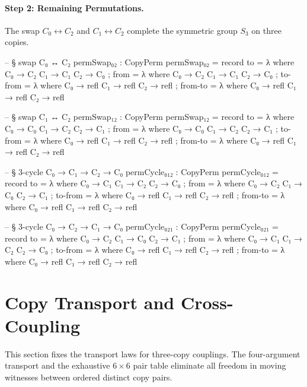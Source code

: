 \documentclass[11pt,a4paper]{book}
\begin{document}
\paragraph{Step 2: Remaining Permutations.}
The swap $C_0 \leftrightarrow C_2$ and $C_1 \leftrightarrow C_2$
complete the symmetric group $S_3$ on three copies.

\begin{code}
-- § swap C₀ ↔ C₂
permSwap₀₂ : CopyPerm
permSwap₀₂ = record
  { to = λ where
      C₀ → C₂
      C₁ → C₁
      C₂ → C₀
  ; from = λ where
      C₀ → C₂
      C₁ → C₁
      C₂ → C₀
  ; to-from = λ where
      C₀ → refl
      C₁ → refl
      C₂ → refl
  ; from-to = λ where
      C₀ → refl
      C₁ → refl
      C₂ → refl
  }

-- § swap C₁ ↔ C₂
permSwap₁₂ : CopyPerm
permSwap₁₂ = record
  { to = λ where
      C₀ → C₀
      C₁ → C₂
      C₂ → C₁
  ; from = λ where
      C₀ → C₀
      C₁ → C₂
      C₂ → C₁
  ; to-from = λ where
      C₀ → refl
      C₁ → refl
      C₂ → refl
  ; from-to = λ where
      C₀ → refl
      C₁ → refl
      C₂ → refl
  }

-- § 3-cycle C₀ → C₁ → C₂ → C₀
permCycle₀₁₂ : CopyPerm
permCycle₀₁₂ = record
  { to = λ where
      C₀ → C₁
      C₁ → C₂
      C₂ → C₀
  ; from = λ where
      C₀ → C₂
      C₁ → C₀
      C₂ → C₁
  ; to-from = λ where
      C₀ → refl
      C₁ → refl
      C₂ → refl
  ; from-to = λ where
      C₀ → refl
      C₁ → refl
      C₂ → refl
  }

-- § 3-cycle C₀ → C₂ → C₁ → C₀
permCycle₀₂₁ : CopyPerm
permCycle₀₂₁ = record
  { to = λ where
      C₀ → C₂
      C₁ → C₀
      C₂ → C₁
  ; from = λ where
      C₀ → C₁
      C₁ → C₂
      C₂ → C₀
  ; to-from = λ where
      C₀ → refl
      C₁ → refl
      C₂ → refl
  ; from-to = λ where
      C₀ → refl
      C₁ → refl
      C₂ → refl
  }
\end{code}

\section{Copy Transport and Cross-Coupling}

This section fixes the transport laws for three-copy couplings.
The four-argument transport and the exhaustive $6 \times 6$ pair table eliminate
all freedom in moving witnesses between ordered distinct copy pairs.
\end{document}
